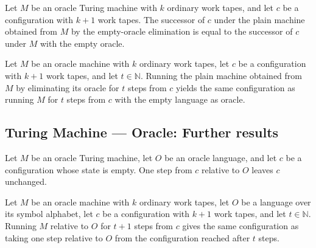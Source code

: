\begin{lemma}
\label{Turing.OracleTM.step_plainEmptyOracle}
\leanok
{}
Let $M$ be an oracle Turing machine with $k$ ordinary work tapes, and let $c$ be a
configuration with $k+1$ work tapes. The successor of $c$ under the plain machine
obtained from $M$ by the empty-oracle elimination is equal to the successor of $c$ under
$M$ with the empty oracle.
\end{lemma}

\begin{theorem}
\label{Turing.OracleTM.runFrom_plainEmptyOracle}
\leanok
{}
Let $M$ be an oracle machine with $k$ ordinary work tapes, let $c$ be a configuration
with $k+1$ work tapes, and let $t\in\mathbb{N}$. Running the plain machine obtained from
$M$ by eliminating its oracle for $t$ steps from $c$ yields the same configuration as
running $M$ for $t$ steps from $c$ with the empty language as oracle.
\end{theorem}

\subsection*{Turing Machine --- Oracle: Further results}

\begin{theorem}
\label{Turing.OracleTM.step_of_halt}
\leanok
{}
Let $M$ be an oracle Turing machine, let $O$ be an oracle language, and let $c$ be a
configuration whose state is empty. One step from $c$ relative to $O$ leaves $c$
unchanged.
\end{theorem}

\begin{theorem}
\label{Turing.OracleTM.runFrom_succ_eq_step'}
\leanok
{}
Let $M$ be an oracle machine with $k$ ordinary work tapes, let $O$ be a language over
its symbol alphabet, let $c$ be a configuration with $k+1$ work tapes, and let
$t\in\mathbb{N}$. Running $M$ relative to $O$ for $t+1$ steps from $c$ gives the same
configuration as taking one step relative to $O$ from the configuration reached after
$t$ steps.
\end{theorem}


